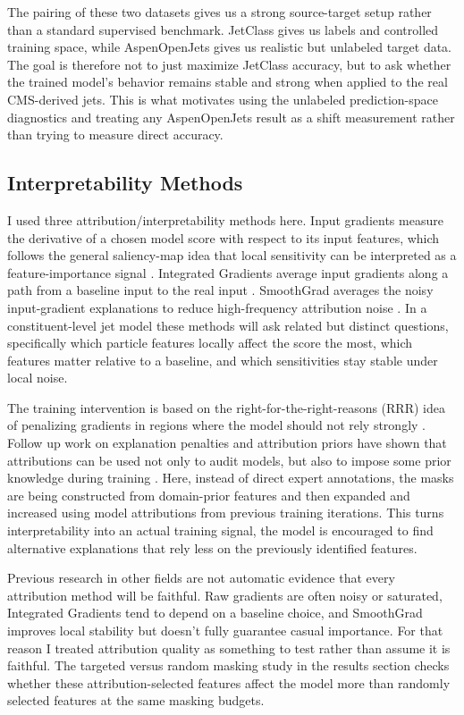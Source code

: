 \documentclass[11pt]{article}
\begin{document}
The pairing of these two datasets gives us a strong source-target setup rather than a standard supervised benchmark. JetClass gives us labels and controlled training space, while AspenOpenJets gives us realistic but unlabeled target data. The goal is therefore not to just maximize JetClass accuracy, but to ask whether the trained model’s behavior remains stable and strong when applied to the real CMS-derived jets. This is what motivates using the unlabeled prediction-space diagnostics and treating any AspenOpenJets result as a shift measurement rather than trying to measure direct accuracy. 


\subsection{Interpretability Methods}

I used three attribution/interpretability methods here. Input gradients measure the derivative of a chosen model score with respect to its input features, which follows the general saliency-map idea that local sensitivity can be interpreted as a feature-importance signal  \cite{simonyan2014deep}. Integrated Gradients average input gradients along a path from a baseline input to the real input \cite{sundararajan2017axiomatic}. SmoothGrad averages the noisy input-gradient explanations to reduce high-frequency attribution noise  \cite{smilkov2017smoothgrad}. In a constituent-level jet model these methods will ask related but distinct questions, specifically which particle features locally affect the score the most, which features matter relative to a baseline, and which sensitivities stay stable under local noise.


The training intervention is based on the right-for-the-right-reasons (RRR) idea of penalizing gradients in regions where the model should not rely strongly \cite{ross2017right}. Follow up work on explanation penalties and attribution priors have shown that attributions can be used not only to audit models, but also to impose some prior knowledge during training \cite{rieger2020interpretations,erion2021improving}. Here, instead of direct expert annotations, the masks are being constructed from domain-prior features and then expanded and increased using model attributions from previous training iterations. This turns interpretability into an actual training signal, the model is encouraged to find alternative explanations that rely less on the previously identified features.

Previous research in other fields are not automatic evidence that every attribution method will be faithful. Raw gradients are often noisy or saturated, Integrated Gradients tend to depend on a baseline choice, and SmoothGrad improves local stability but doesn’t fully guarantee casual importance. For that reason I treated attribution quality as something to test rather than assume it is faithful. The targeted versus random masking study in the results section checks whether these attribution-selected features affect the model more than randomly selected features at the same masking budgets.
\end{document}
